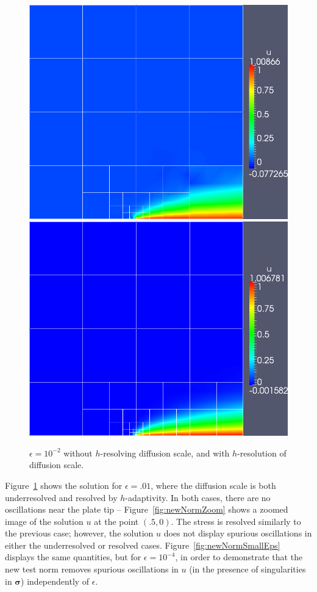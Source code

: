 \documentclass[letterpaper]{article}
\def\bsigma{\boldsymbol\sigma}
\begin{document}
\begin{figure}[!h]
\centering
\includegraphics[scale=.275]{figs/LaplaceFigs/coupled1e2h1e2.png}
\includegraphics[scale=.275]{figs/LaplaceFigs/coupled1e2h1e3.png}
\caption{$\epsilon = 10^{-2}$ without $h$-resolving diffusion scale, and with $h$-resolution of diffusion scale.}
\label{fig:newNorm}
\end{figure}

Figure~\ref{fig:newNorm} shows the solution for $\epsilon = .01$, where the
diffusion scale is both underresolved and resolved by $h$-adaptivity.  In both
cases, there are no oscillations near the plate tip --
Figure~\ref{fig:newNormZoom} shows a zoomed image of the solution $u$ at the
point $(.5,0)$.  The stress is resolved similarly to the previous case;
however, the solution $u$ does not display spurious oscillations in either the
underresolved or resolved cases.  Figure~\ref{fig:newNormSmallEps} displays
the same quantities, but for $\epsilon = 10^{-4}$, in order to demonstrate
that the new test norm removes spurious oscillations in $u$ (in the presence
of singularities in $\bsigma$) independently of $\epsilon$.
\end{document}
